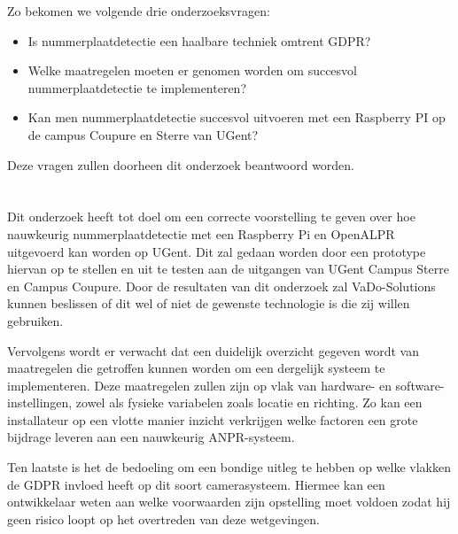 Zo bekomen we volgende drie onderzoeksvragen:
\begin{itemize}
	\item Is nummerplaatdetectie een haalbare techniek omtrent GDPR?
	\item Welke maatregelen moeten er genomen worden om succesvol nummerplaatdetectie te implementeren?
	\item Kan men nummerplaatdetectie succesvol uitvoeren met een Raspberry PI op de campus Coupure en Sterre van UGent?
\end{itemize}

Deze vragen zullen doorheen dit onderzoek beantwoord worden.

\section{}
\label{sec:onderzoeksdoelstelling}


Dit onderzoek heeft tot doel om een correcte voorstelling te geven over hoe nauwkeurig nummerplaatdetectie met een Raspberry Pi en OpenALPR uitgevoerd kan worden op UGent. Dit zal gedaan worden door een prototype hiervan op te stellen en uit te testen aan de uitgangen van UGent Campus Sterre en Campus Coupure. Door de resultaten van dit onderzoek zal VaDo-Solutions kunnen beslissen of dit wel of niet de gewenste technologie is die zij willen gebruiken.

Vervolgens wordt er verwacht dat een duidelijk overzicht gegeven wordt van maatregelen die getroffen kunnen worden om een dergelijk systeem te implementeren. Deze maatregelen zullen zijn op vlak van hardware- en software-instellingen, zowel als fysieke variabelen zoals locatie en richting. Zo kan een installateur op een vlotte manier inzicht verkrijgen welke factoren een grote bijdrage leveren aan een nauwkeurig ANPR-systeem.

Ten laatste is het de bedoeling om een bondige uitleg te hebben op welke vlakken de GDPR invloed heeft op dit soort camerasysteem. Hiermee kan een ontwikkelaar weten aan welke voorwaarden zijn opstelling moet voldoen zodat hij geen risico loopt op het overtreden van deze wetgevingen.

\section{}
\label{sec:opzet-bachelorproef}

